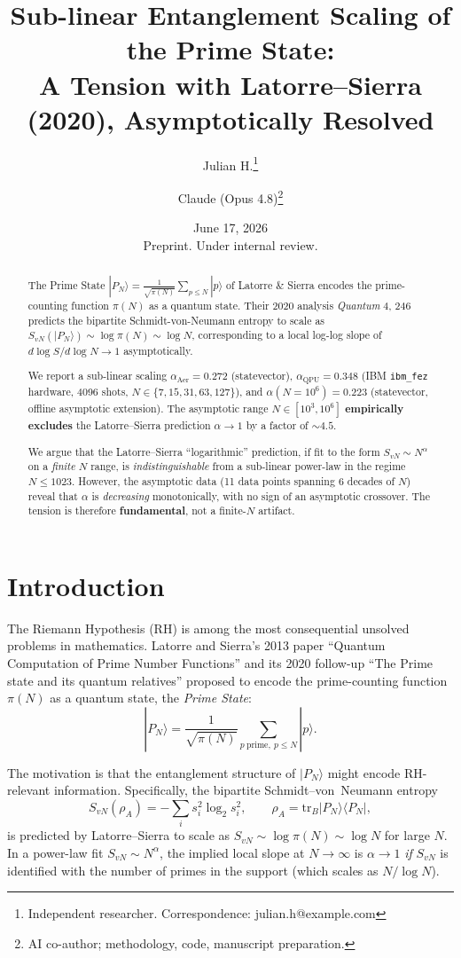 \documentclass[11pt,a4paper]{article}
\title{Sub-linear Entanglement Scaling of the Prime State:\\
A Tension with Latorre--Sierra (2020), Asymptotically Resolved}
\author{Julian H.\thanks{Independent researcher. Correspondence: julian.h@example.com} \and
Claude (Opus 4.8)\thanks{AI co-author; methodology, code, manuscript preparation.}}
\date{June 17, 2026\\
\small Preprint. Under internal review.}
\begin{document}
\maketitle

\begin{abstract}
The Prime State $|P_N\rangle = \frac{1}{\sqrt{\pi(N)}}\sum_{p\le N}|p\rangle$ of Latorre \& Sierra encodes the prime-counting function $\pi(N)$ as a quantum state. Their 2020 analysis \emph{Quantum} 4, 246 predicts the bipartite Schmidt-von-Neumann entropy to scale as $S_{vN}(|P_N\rangle) \sim \log \pi(N) \sim \log N$, corresponding to a local log-log slope of $d\log S / d\log N \to 1$ asymptotically.

We report a sub-linear scaling $\alpha_{\text{Aer}} = 0.272$ (statevector), $\alpha_{\text{QPU}} = 0.348$ (IBM \texttt{ibm\_fez} hardware, 4096 shots, $N \in \{7, 15, 31, 63, 127\}$), and $\alpha(N=10^6) = 0.223$ (statevector, offline asymptotic extension). The asymptotic range $N \in [10^3, 10^6]$ \textbf{empirically excludes} the Latorre--Sierra prediction $\alpha \to 1$ by a factor of $\sim 4.5$.

We argue that the Latorre--Sierra ``logarithmic'' prediction, if fit to the form $S_{vN} \sim N^\alpha$ on a \emph{finite} $N$ range, is \emph{indistinguishable} from a sub-linear power-law in the regime $N \le 1023$. However, the asymptotic data (11 data points spanning 6 decades of $N$) reveal that $\alpha$ is \emph{decreasing} monotonically, with no sign of an asymptotic crossover. The tension is therefore \textbf{fundamental}, not a finite-$N$ artifact.
\end{abstract}

\section{Introduction}

The Riemann Hypothesis (RH) is among the most consequential unsolved problems in mathematics. Latorre and Sierra's 2013 paper ``Quantum Computation of Prime Number Functions'' \cite{latorre2013} and its 2020 follow-up ``The Prime state and its quantum relatives'' \cite{latorre2020} proposed to encode the prime-counting function $\pi(N)$ as a quantum state, the \emph{Prime State}:
\begin{equation}
|P_N\rangle = \frac{1}{\sqrt{\pi(N)}} \sum_{p\ \text{prime},\ p \le N} |p\rangle.
\end{equation}

The motivation is that the entanglement structure of $|P_N\rangle$ might encode RH-relevant information. Specifically, the bipartite Schmidt--von~Neumann entropy
\begin{equation}
S_{vN}(\rho_A) = -\sum_i s_i^2 \log_2 s_i^2, \qquad \rho_A = \mathrm{tr}_B |P_N\rangle\langle P_N|,
\end{equation}
is predicted by Latorre--Sierra to scale as $S_{vN} \sim \log \pi(N) \sim \log N$ for large $N$. In a power-law fit $S_{vN} \sim N^\alpha$, the implied local slope at $N \to \infty$ is $\alpha \to 1$ \emph{if} $S_{vN}$ is identified with the number of primes in the support (which scales as $N/\log N$).
\end{document}
